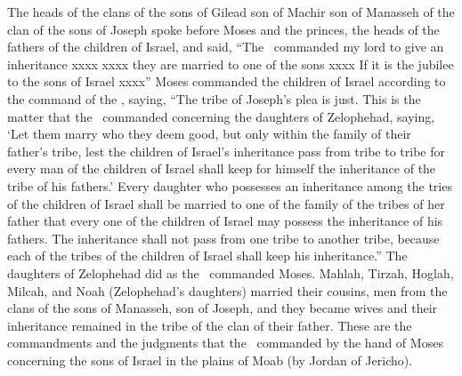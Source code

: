 
\begin{inparaenum}
   The heads of the clans of the sons of Gilead son of Machir son of Manasseh of the clan of the sons of Joseph spoke before Moses and the princes, the heads of the fathers of the children of Israel,%
   and said, ``The \lord\ commanded my lord to give an inheritance xxxx%
   xxxx they are married to one of the sons xxxx%
   If it is the jubilee to the sons of Israel xxxx''%
   Moses commanded the children of Israel according to the command of the \lord, saying, ``The tribe of Joseph's plea is just.%
   This is the matter that the \lord\ commanded concerning the daughters of Zelophehad, saying, `Let them marry who they deem good, but only within the family of their father's tribe,%
   lest the children of Israel's inheritance pass from tribe to tribe for every man of the children of Israel shall keep for himself the inheritance of the tribe of his fathers.'%
   Every daughter who possesses an inheritance among the tries of the children of Israel shall be married to one of the family of the tribes of her father that every one of the children of Israel may possess the inheritance of his fathers.%
   The inheritance shall not pass from one tribe to another tribe, because each of the tribes of the children of Israel shall keep his inheritance.''%
   The daughters of Zelophehad did as the \lord\ commanded Moses.%
   Mahlah, Tirzah, Hoglah, Milcah, and Noah (Zelophehad's daughters) married their cousins,%
   men from the clans of the sons of Manasseh, son of Joseph, and they became wives and their inheritance remained in the tribe of the clan of their father.%
   These are the commandments and the judgments that the \lord\ commanded by the hand of Moses concerning the sons of Israel in the plains of Moab (by Jordan of Jericho).%
\end{inparaenum}
